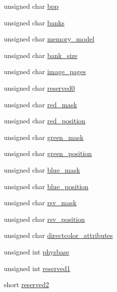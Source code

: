 \begin{DoxyCompactItemize}
\item 
unsigned char \hyperlink{structvesaModeInfo__t_acbf51c6b217de951bd6b40ae60b2343d}{bpp}
\item 
unsigned char \hyperlink{structvesaModeInfo__t_a543f6b11b8caed004dc0f4dd8fed13c8}{banks}
\item 
unsigned char \hyperlink{structvesaModeInfo__t_a3f6f4827e2c4d40d89a6e8ec6e15c8f4}{memory\+\_\+model}
\item 
unsigned char \hyperlink{structvesaModeInfo__t_a6f7476f0df157c2fc8969131512a9bc1}{bank\+\_\+size}
\item 
unsigned char \hyperlink{structvesaModeInfo__t_a072aebfd294ef7c940917ad1f5d53176}{image\+\_\+pages}
\item 
unsigned char \hyperlink{structvesaModeInfo__t_a0f912afd0a853ea123ad3a157fc579c9}{reserved0}
\item 
unsigned char \hyperlink{structvesaModeInfo__t_a653392718e3a3c21aad77d0236ec8929}{red\+\_\+mask}
\item 
unsigned char \hyperlink{structvesaModeInfo__t_a96ecd4368bbcf68b97c9496939069c55}{red\+\_\+position}
\item 
unsigned char \hyperlink{structvesaModeInfo__t_a00414463a3873e70cc7418f109b35f06}{green\+\_\+mask}
\item 
unsigned char \hyperlink{structvesaModeInfo__t_ac5e0330302132e9423fa856f26a34286}{green\+\_\+position}
\item 
unsigned char \hyperlink{structvesaModeInfo__t_aff78588c9039e0f8985d08bc2c5dd5ae}{blue\+\_\+mask}
\item 
unsigned char \hyperlink{structvesaModeInfo__t_a20289f01bea4e5cbb2533e3c97f8d308}{blue\+\_\+position}
\item 
unsigned char \hyperlink{structvesaModeInfo__t_a8b424620d78b885292f29849acfe962c}{rsv\+\_\+mask}
\item 
unsigned char \hyperlink{structvesaModeInfo__t_a2af8762aa842598e8a6a33872a83b5ab}{rsv\+\_\+position}
\item 
unsigned char \hyperlink{structvesaModeInfo__t_afb95209f1e3ffa74635cb68495ecec26}{directcolor\+\_\+attributes}
\item 
unsigned int \hyperlink{structvesaModeInfo__t_a0233746f9f5f4ecab8622c3a08dc6f5c}{physbase}
\item 
unsigned int \hyperlink{structvesaModeInfo__t_aacef0071c533de26e708289e474a0542}{reserved1}
\item 
short \hyperlink{structvesaModeInfo__t_a5ffbef6f6a9ac0ae6975827208b77ec5}{reserved2}
\end{DoxyCompactItemize}


